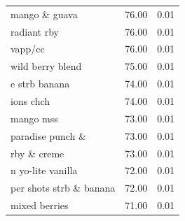 \begin{table}
\begin{tabular}{lrr}
mango \& guava & 76.00 & 0.01 \\
radiant rby & 76.00 & 0.01 \\
vapp/cc & 76.00 & 0.01 \\
wild berry blend & 75.00 & 0.01 \\
e strb banana & 74.00 & 0.01 \\
ions chch & 74.00 & 0.01 \\
mango mss & 73.00 & 0.01 \\
paradise punch \& & 73.00 & 0.01 \\
rby \& creme & 73.00 & 0.01 \\
n yo-lite vanilla & 72.00 & 0.01 \\
per shots strb \& banana & 72.00 & 0.01 \\
mixed berries & 71.00 & 0.01 \\
\bottomrule
\end{tabular}
\end{table}
